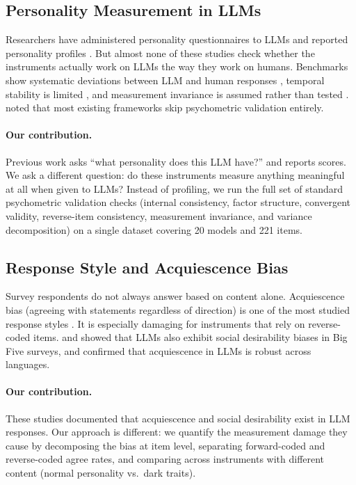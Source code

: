 \documentclass[11pt]{article}
\begin{document}
\subsection{Personality Measurement in LLMs}

Researchers have administered personality questionnaires to LLMs and reported personality profiles \citep{miotto2023gpt3, serapio2025psychometric, bhandari2025evaluating, sorokovikova2024evaluating, lee2025trait, hagendorff2024machine}. But almost none of these studies check whether the instruments actually work on LLMs the way they work on humans. Benchmarks show systematic deviations between LLM and human responses \citep{xie2025aipsychobench}, temporal stability is limited \citep{bodroza2024personality}, and measurement invariance is assumed rather than tested \citep{suhr2025challenging}. \citet{chen2025humanizing} noted that most existing frameworks skip psychometric validation entirely.

\paragraph{Our contribution.}
Previous work asks ``what personality does this LLM have?'' and reports scores. We ask a different question: do these instruments measure anything meaningful at all when given to LLMs? Instead of profiling, we run the full set of standard psychometric validation checks (internal consistency, factor structure, convergent validity, reverse-item consistency, measurement invariance, and variance decomposition) on a single dataset covering 20 models and 221 items.

\subsection{Response Style and Acquiescence Bias}

Survey respondents do not always answer based on content alone. Acquiescence bias (agreeing with statements regardless of direction) is one of the most studied response styles \citep{paulhus1991response, lord1968statistical, baumgartner2007modeling}. It is especially damaging for instruments that rely on reverse-coded items. \citet{acerbi2024llm} and \citet{salecha2024llm} showed that LLMs also exhibit social desirability biases in Big Five surveys, and \citet{acquiescence2025emnlp} confirmed that acquiescence in LLMs is robust across languages.

\paragraph{Our contribution.}
These studies documented that acquiescence and social desirability exist in LLM responses. Our approach is different: we quantify the measurement damage they cause by decomposing the bias at item level, separating forward-coded and reverse-coded agree rates, and comparing across instruments with different content (normal personality vs.\ dark traits).
\end{document}
